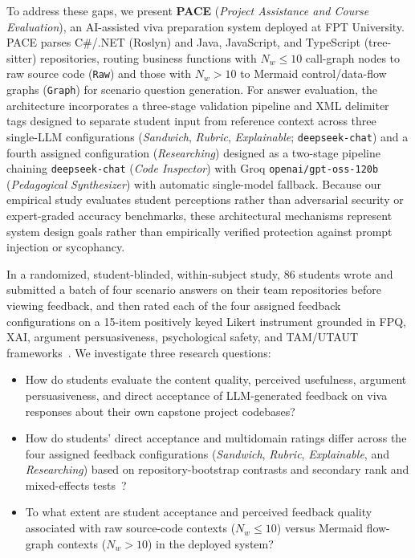 \documentclass{llncs}
\begin{document}
To address these gaps, we present \textbf{PACE} (\textit{Project Assistance and Course Evaluation}), an AI-assisted viva preparation system deployed at FPT University. PACE parses C\#/.NET (Roslyn) and Java, JavaScript, and TypeScript (tree-sitter) repositories, routing business functions with $N_w \le 10$ call-graph nodes to raw source code (\texttt{Raw}) and those with $N_w > 10$ to Mermaid control/data-flow graphs (\texttt{Graph}) for scenario question generation. For answer evaluation, the architecture incorporates a three-stage validation pipeline and XML delimiter tags designed to separate student input from reference context across three single-LLM configurations (\textit{Sandwich}, \textit{Rubric}, \textit{Explainable}; \texttt{deepseek-chat}) and a fourth assigned configuration (\textit{Researching}) designed as a two-stage pipeline chaining \texttt{deepseek-chat} (\textit{Code Inspector}) with Groq \texttt{openai/gpt-oss-120b} (\textit{Pedagogical Synthesizer}) with automatic single-model fallback. Because our empirical study evaluates student perceptions rather than adversarial security or expert-graded accuracy benchmarks, these architectural mechanisms represent system design goals rather than empirically verified protection against prompt injection or sycophancy.

In a randomized, student-blinded, within-subject study, 86 students wrote and submitted a batch of four scenario answers on their team repositories before viewing feedback, and then rated each of the four assigned feedback configurations on a 15-item positively keyed Likert instrument grounded in FPQ, XAI, argument persuasiveness, psychological safety, and TAM/UTAUT frameworks~\cite{cronbach1951coefficient,hayes2020use,podsakoff2003common,kim2019straightlining,vansonderen2013ineffectiveness}. We investigate three research questions:
\begin{itemize}
    \item[\textbf{RQ1}] How do students evaluate the content quality, perceived usefulness, argument persuasiveness, and direct acceptance of LLM-generated feedback on viva responses about their own capstone project codebases?
    \item[\textbf{RQ2}] How do students' direct acceptance and multidomain ratings differ across the four assigned feedback configurations (\textit{Sandwich}, \textit{Rubric}, \textit{Explainable}, and \textit{Researching}) based on repository-bootstrap contrasts and secondary rank and mixed-effects tests~\cite{friedman1937use,holm1979simple,lakens2017equivalence}?
    \item[\textbf{RQ3}] To what extent are student acceptance and perceived feedback quality associated with raw source-code contexts ($N_w \leq 10$) versus Mermaid flow-graph contexts ($N_w > 10$) in the deployed system?
\end{itemize}
\end{document}

